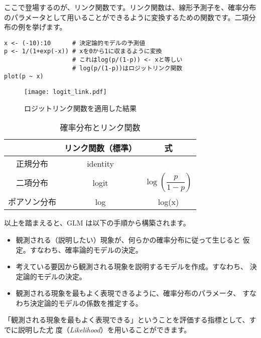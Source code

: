 ここで登場するのが、リンク関数です。リンク関数は、線形予測子を、確率分布のパラメータとして用いることができるように変換するための関数です。二項分布の例を挙げます。
\begin{verbatim}
x <- (-10):10      # 決定論的モデルの予測値
p <- 1/(1+exp(-x)) # xを0から1に収まるように変換
                   # これはlog(p/(1-p)) <- xと等しい
                   # log(p/(1-p))はロジットリンク関数
plot(p ~ x)
\end{verbatim}
\begin{figure}[htb]
\begin{center}
\graphicspath{{3_glm/figs/}}
\texttt{[image: logit\_link.pdf]}\\
\caption{ロジットリンク関数を適用した結果}
\label{logit_link}
\end{center}
\end{figure}

\begin{table}[htb]
\begin{center}
\caption{確率分布とリンク関数}
\label{link_func}
\begin{tabular}{ccc} \toprule
 & リンク関数（標準） & 式 \\ \midrule
正規分布 &  identity &  \\ 
二項分布 & logit &  $\log(\dfrac{p}{1-p})$ \\ 
ポアソン分布 & log & log(x) \\ \bottomrule
\end{tabular}
\end{center}
\end{table}

以上を踏まえると、GLM
は以下の手順から構築されます。
\begin{itemize}
 \item 観測される（説明したい）現象が、何らかの確率分布に従って生じると
       仮定。すなわち、確率論的モデルの決定。
 \item 考えている要因から観測される現象を説明するモデルを作成。すなわち、
       決定論的モデルの決定。
 \item 観測される現象を最もよく表現できるように、確率分布のパラメータ、
       すなわち決定論的モデルの係数を推定する。
\end{itemize}

「観測される現象を最もよく表現できる」ということを評価する指標として、すでに説明した尤
度（\textit{Likelihood}）を用いることができます。

